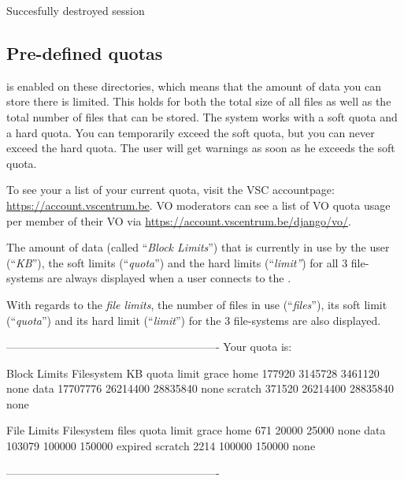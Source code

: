 \begin{prompt}
Succesfully destroyed session
\end{prompt}

\fi


\subsection{Pre-defined quotas}
\label{subsec:predfined-quotas}
\hypertarget{predefined-quotas}{}

 is enabled on these directories, which means that the amount of
data you can store there is limited. This holds for both the total size of all
files as well as the total number of files that can be stored. The system works
with a soft quota and a hard quota. You can temporarily exceed the soft quota,
but you can never exceed the hard quota. The user will get warnings as soon as
he exceeds the soft quota.


\ifgent
To see your a list of your current quota, visit the VSC accountpage: \url{https://account.vscentrum.be}.
VO moderators can see a list of VO quota usage per member of their VO via \url{https://account.vscentrum.be/django/vo/}.
\fi

\ifantwerpen
The amount of data (called ``\emph{Block Limits}'') that is currently in use
by the user (``\emph{KB}''), the soft limits (``\emph{quota}'') and the
hard limits (``\emph{limit''}) for all 3 file-systems are always displayed
when a user connects to the \hpc.

 With regards to the \emph{file limits}, the number of files in use
 (``\emph{files}''), its soft limit (``\emph{quota}'') and its hard limit
 (``\emph{limit}'') for the 3 file-systems are also displayed.

\begin{prompt}
----------------------------------------------------------
Your quota is:

                   Block Limits
   Filesystem         KB      quota      limit    grace
   home           177920    3145728    3461120     none
   data         17707776   26214400   28835840     none
   scratch        371520   26214400   28835840     none

                File Limits
   Filesystem      files      quota      limit    grace
   home              671      20000      25000     none
   data           103079     100000     150000  expired
   scratch          2214     100000     150000     none

----------------------------------------------------------
\end{prompt}

